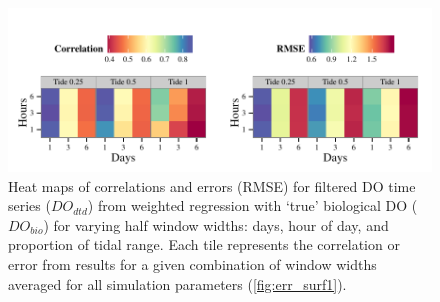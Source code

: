 \documentclass[letterpaper,12pt,oneside]{article}\usepackage[]{graphicx}\usepackage[]{color}
\makeatletter
\def\maxwidth{ %
  \ifdim\Gin@nat@width>\linewidth
    \linewidth
  \else
    \Gin@nat@width
  \fi
}
\newenvironment{knitrout}{}{} %
\makeatother
\begin{document}
\centering\vspace*{\fill}
\begin{knitrout}
\color{fgcolor}\begin{figure}[!ht]


{\centering \includegraphics[width=\maxwidth]{figure/err_surf2} 

}

\caption[Heat maps of correlations and errors (\ac{RMSE}) for filtered \ac{DO} time series ($DO_{dtd}$) from weighted regression with `true' biological \ac{DO} ($DO_{bio}$) for varying half window widths]{Heat maps of correlations and errors (\ac{RMSE}) for filtered \ac{DO} time series ($DO_{dtd}$) from weighted regression with `true' biological \ac{DO} ($DO_{bio}$) for varying half window widths: days, hour of day, and proportion of tidal range.  Each tile represents the correlation or error from results for a given combination of window widths averaged for all simulation parameters (\cref{fig:err_surf1}).\label{fig:err_surf2}}
\end{figure}


\end{knitrout}
\vfill
\clearpage
\end{document}
